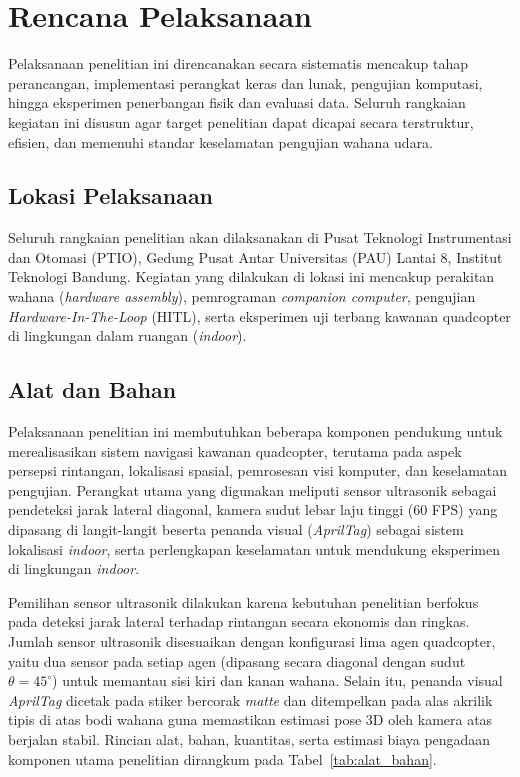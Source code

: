 \documentclass[12pt,a4paper]{report}
\numberwithin{equation}{chapter}
\begin{document}
\section{Rencana Pelaksanaan}
Pelaksanaan penelitian ini direncanakan secara sistematis mencakup tahap perancangan, implementasi perangkat keras dan lunak, pengujian komputasi, hingga eksperimen penerbangan fisik dan evaluasi data. Seluruh rangkaian kegiatan ini disusun agar target penelitian dapat dicapai secara terstruktur, efisien, dan memenuhi standar keselamatan pengujian wahana udara.

\subsection{Lokasi Pelaksanaan}
Seluruh rangkaian penelitian akan dilaksanakan di Pusat Teknologi Instrumentasi dan Otomasi (PTIO\label{abbr:ptio}), Gedung Pusat Antar Universitas (PAU) Lantai 8, Institut Teknologi Bandung. Kegiatan yang dilakukan di lokasi ini mencakup perakitan wahana (\textit{hardware assembly}), pemrograman \textit{companion computer}, pengujian \textit{Hardware-In-The-Loop} (HITL), serta eksperimen uji terbang kawanan quadcopter di lingkungan dalam ruangan (\textit{indoor}).

\subsection{Alat dan Bahan}
Pelaksanaan penelitian ini membutuhkan beberapa komponen pendukung untuk merealisasikan sistem navigasi kawanan quadcopter, terutama pada aspek persepsi rintangan, lokalisasi spasial, pemrosesan visi komputer, dan keselamatan pengujian.
Perangkat utama yang digunakan meliputi sensor ultrasonik sebagai pendeteksi jarak lateral diagonal, kamera sudut lebar laju tinggi (60 FPS) yang dipasang di langit-langit beserta penanda visual (\textit{AprilTag}) sebagai sistem lokalisasi \textit{indoor}, serta perlengkapan keselamatan untuk mendukung eksperimen di lingkungan \textit{indoor}.

Pemilihan sensor ultrasonik dilakukan karena kebutuhan penelitian berfokus pada deteksi jarak lateral terhadap rintangan secara ekonomis dan ringkas.
Jumlah sensor ultrasonik disesuaikan dengan konfigurasi lima agen quadcopter, yaitu dua sensor pada setiap agen (dipasang secara diagonal dengan sudut $\theta = 45^\circ$) untuk memantau sisi kiri dan kanan wahana.
Selain itu, penanda visual \textit{AprilTag} dicetak pada stiker bercorak \textit{matte} dan ditempelkan pada alas akrilik tipis di atas bodi wahana guna memastikan estimasi pose 3D oleh kamera atas berjalan stabil.
Rincian alat, bahan, kuantitas, serta estimasi biaya pengadaan komponen utama penelitian dirangkum pada Tabel~\ref{tab:alat_bahan}.
\end{document}
